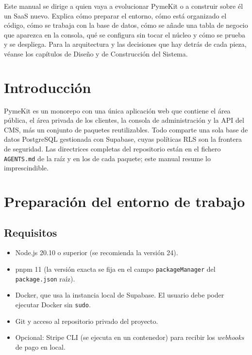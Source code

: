 \label{cap:manual-desarrollador}

Este manual se dirige a quien vaya a evolucionar PymeKit o a construir sobre
él un SaaS nuevo. Explica cómo preparar el entorno, cómo está organizado el
código, cómo se trabaja con la base de datos, cómo se añade una tabla de
negocio que aparezca en la consola, qué se configura sin tocar el núcleo y cómo
se prueba y se despliega. Para la arquitectura y las decisiones que hay detrás
de cada pieza, véanse los capítulos de Diseño y de Construcción del Sistema.

\section{Introducción}
\label{sec:dg-introduccion}

PymeKit es un monorepo con una única aplicación web que contiene el área
pública, el área privada de los clientes, la consola de administración y la
API del CMS, más un conjunto de paquetes reutilizables. Todo comparte una sola
base de datos PostgreSQL gestionada con Supabase, cuyas políticas RLS son la
frontera de seguridad. Las directrices completas del repositorio
están en el fichero \texttt{AGENTS.md} de la raíz y en los de cada paquete;
este manual resume lo imprescindible.

\section{Preparación del entorno de trabajo}
\label{sec:dg-entorno}

\subsection{Requisitos}

\begin{itemize}
  \item Node.js 20.10 o superior (se recomienda la versión 24).
  \item pnpm 11 (la versión exacta se fija en el campo
        \texttt{packageManager} del \texttt{package.json} raíz).
  \item Docker, que usa la instancia local de Supabase. El usuario debe poder
        ejecutar Docker sin \texttt{sudo}.
  \item Git y acceso al repositorio privado del proyecto.
  \item Opcional: Stripe CLI (se ejecuta en un contenedor) para recibir los
        \textit{webhooks} de pago en local.
\end{itemize}

